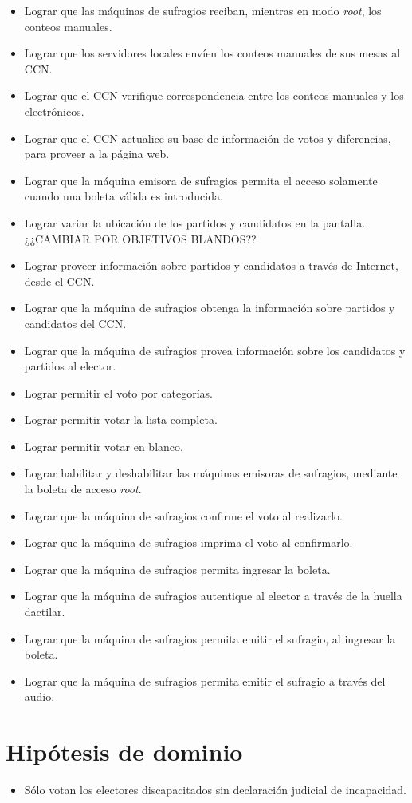 \documentclass[spanish, 10pt,a4paper]{article}
\numberwithin{equation}{section} %
\begin{document}
\begin{itemize}
\item Lograr que las máquinas de sufragios reciban, mientras en modo \emph{root}, los conteos manuales.
\item Lograr que los servidores locales envíen los conteos manuales de sus mesas al CCN.
\item Lograr que el CCN verifique correspondencia entre los conteos manuales y los electrónicos.
\item Lograr que el CCN actualice su base de información de votos y diferencias, para proveer a la página web.
\item Lograr que la máquina emisora de sufragios permita el acceso solamente cuando una boleta válida es introducida.
\item Lograr variar la ubicación de los partidos y candidatos en la pantalla. ¿¿CAMBIAR POR OBJETIVOS BLANDOS??
\item Lograr proveer información sobre partidos y candidatos a través de Internet, desde el CCN.
\item Lograr que la máquina de sufragios obtenga la información sobre partidos y candidatos del CCN.
\item Lograr que la máquina de sufragios provea información sobre los candidatos y partidos al elector.
\item Lograr permitir el voto por categorías.
\item Lograr permitir votar la lista completa.
\item Lograr permitir votar en blanco.
\item Lograr habilitar y deshabilitar las máquinas emisoras de sufragios, mediante la boleta de acceso \emph{root}.
\item Lograr que la máquina de sufragios confirme el voto al realizarlo.
\item Lograr que la máquina de sufragios imprima el voto al confirmarlo.
\item Lograr que la máquina de sufragios permita ingresar la boleta.
\item Lograr que la máquina de sufragios autentique al elector a través de la huella dactilar.
\item Lograr que la máquina de sufragios permita emitir el sufragio, al ingresar la boleta.
\item Lograr que la máquina de sufragios permita emitir el sufragio a través del audio.

\end{itemize}

\section{Hipótesis de dominio}

\begin{itemize}
\item Sólo votan los electores discapacitados sin declaración judicial de incapacidad.
\end{itemize}
\end{document}

